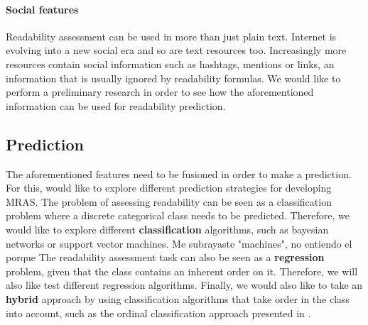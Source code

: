 \documentclass[12pt]{article}
\begin{document}
\paragraph{Social features}
Readability assessment can be used in more than just plain text. Internet is evolving into a new social era and so are text resources too. Increasingly more resources contain social information such as hashtags, mentions or links, an information that is usually ignored by readability formulas. We would like to perform a preliminary research in order to see how the aforementioned information can be used for readability prediction.




\subsection{Prediction}
The aforementioned features need to be fusioned in order to make a prediction.
For this, would like to explore different prediction strategies for developing MRAS. The problem of assessing readability can be seen as a classification problem where a discrete categorical class needs to be predicted. Therefore, we would like to  explore different \textbf{classification} algorithms, such as bayesian networks or support vector machines. {\color{red} Me subrayaste "machines", no entiendo el porque} The readability assessment task can also be seen as a \textbf{regression} problem, given that the class contains an inherent order on it. Therefore, we will also like test different regression algorithms. Finally, we would also like to take an \textbf{hybrid} approach by using classification algorithms that take order in the class into account, such as the ordinal classification approach presented in \cite{frank2001simple}.
\end{document}
